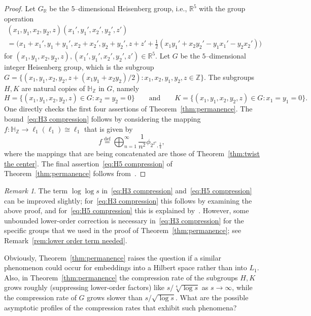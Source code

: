 \documentclass[11pt,reqno]{amsart}
\renewcommand{\H}{\mathbb{H}}
\newcommand{\R}{\mathbb{R}}
\newcommand{\Z}{\mathbb{Z}}
\newcommand{\0}{\mathbf{0}}
\renewcommand{\1}{\mathbf 1}
\newcommand{\from}{\colon}
\newcommand{\eqdef}{\stackrel{\mathrm{def}}{=}}
\theoremstyle{remark}
\newtheorem{remark}[thm]{Remark}
\begin{document}
\begin{proof} Let $G_\R$ be the $5$--dimensional Heisenberg group, i.e., $\R^5$ with the group operation
\begin{multline*}
(x_1,y_1,x_2,y_2,z)(x_1',y_1',x_2',y_2',z')\\=\Big(x_1+x_1',y_1+y_1',x_2+x_2',y_2+y_2',z+z'+\frac{1}{2}(x_1y_1'+x_2y_2'- y_1x_1'-y_2x_2')\Big)
\end{multline*}
for $(x_1,y_1,x_2,y_2,z), (x_1',y_1',x_2',y_2',z')\in \R^5$.  Let $G$ be the $5$--dimensional integer Heisenberg group, which is the subgroup $G=\big\{(x_1,y_1,x_2,y_2,z+(x_1y_1+x_2y_2)/2)  : x_1,x_2,y_1,y_2,z\in \Z\big\}.$
The subgroups $H,K$ are natural copies of $\H_\Z$ in $G$, namely $$H=\{(x_1,y_1,x_2,y_2,z)\in G: x_2=y_2=0\} \qquad \mathrm{and} \qquad K=\{(x_1,y_1,x_2,y_2,z)\in G: x_1=y_1=0\}.$$ One directly checks the first four assertions of Theorem~\ref{thm:permanence}. The bound~\eqref{eq:H3 compression} follows by considering the mapping $f\from \H_\Z\to \ell_1(\ell_1)\cong\ell_1$ that is given by
$$
f\eqdef \bigoplus_{n=1}^\infty \frac{1}{n^2}\phi_{2^{2^n},\frac14},
$$
where the mappings that are being concatenated are those of Theorem~\ref{thm:twist the center}. The final assertion~\eqref{eq:H5 compression} of Theorem~\ref{thm:permanence} follows from~\cite[Theorem~9]{NY18}.
\end{proof}

\begin{remark} The term $\log\log s$ in~\eqref{eq:H3 compression} and~\eqref{eq:H5 compression} can be improved slightly; for~\eqref{eq:H3 compression} this follows by examining the above proof, and  for~\eqref{eq:H5 compression} this is explained by~\cite[Theorem~9]{NY18}. However, some unbounded lower-order correction is necessary in~\eqref{eq:H3 compression} for the specific groups that we used in the proof of Theorem~\ref{thm:permanence}; see Remark~\ref{rem:lower order term needed}.
\end{remark}

Obviously, Theorem~\ref{thm:permanence}  raises the  question if a similar phenomenon could occur for embeddings into a Hilbert space rather than into $L_1$. Also, in Theorem~\ref{thm:permanence} the compression rate of the subgroups $H,K$ grows roughly (suppressing lower-order factors) like $s/\sqrt[4]{\log s}$ as $s\to \infty$, while the compression rate of $G$  grows slower than $s/\sqrt{\log s}$. What are the possible asymptotic profiles of the compression rates that exhibit such phenomena?
\end{document}

